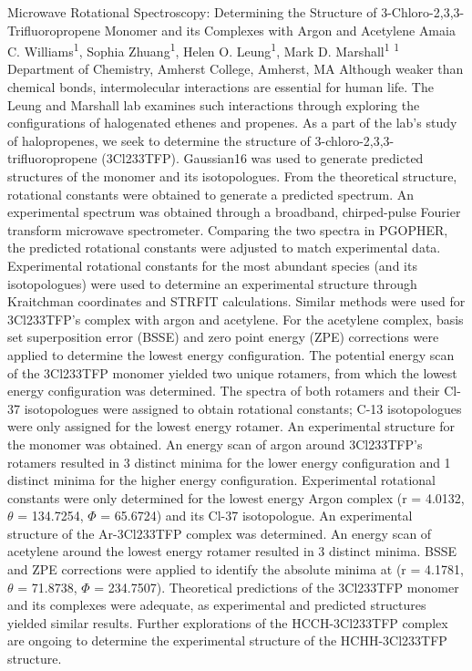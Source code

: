 \makeabstract
    {
    Microwave Rotational Spectroscopy: Determining the Structure of 3-Chloro-2,3,3-Trifluoropropene Monomer and its Complexes with Argon and Acetylene
    }
    {
    \vspace{-20pt}
    Amaia C. Williams\textsuperscript{1}, Sophia Zhuang\textsuperscript{1}, Helen O. Leung\textsuperscript{1}, Mark D. Marshall\textsuperscript{1}
    }
    {
    \textsuperscript{1} Department of Chemistry, Amherst College, Amherst, MA
    }
    {
    Although weaker than chemical bonds, intermolecular interactions are essential for human life. The Leung and Marshall lab examines such interactions through exploring the configurations of halogenated ethenes and propenes. As a part of the lab{\textquoteright}s study of halopropenes, we seek to determine the structure of 3-chloro-2,3,3-trifluoropropene (3Cl233TFP).
    }
    {
    Gaussian16 was used to generate predicted structures of the monomer and its isotopologues. From the theoretical structure, rotational constants were obtained to generate a predicted spectrum. An experimental spectrum was obtained through a broadband, chirped-pulse Fourier transform microwave spectrometer. Comparing the two spectra in PGOPHER, the predicted rotational constants were adjusted to match experimental data. Experimental rotational constants for the most abundant species (and its isotopologues) were used to determine an experimental structure through Kraitchman coordinates and STRFIT calculations. Similar methods were used for 3Cl233TFP{\textquoteright}s complex with argon and acetylene. For the acetylene complex, basis set superposition error (BSSE) and zero point energy (ZPE) corrections were applied to determine the lowest energy configuration. 
    }
    {
    The potential energy scan of the 3Cl233TFP monomer yielded two unique rotamers, from which the lowest energy configuration was determined. The spectra of both rotamers and their Cl-37 isotopologues were assigned to obtain rotational constants; C-13 isotopologues were only assigned for the lowest energy rotamer. An experimental structure for the monomer was obtained. An energy scan of argon around 3Cl233TFP{\textquoteright}s rotamers resulted in 3 distinct minima for the lower energy configuration and 1 distinct minima for the higher energy configuration. Experimental rotational constants were only determined for the lowest energy Argon complex (r = 4.0132, \ensuremath{\theta} = 134.7254, \ensuremath{\Phi} = 65.6724) and its Cl-37 isotopologue. An experimental structure of the Ar-3Cl233TFP complex was determined. An energy scan of acetylene around the lowest energy rotamer resulted in 3 distinct minima. BSSE and ZPE corrections were applied to identify the absolute minima at (r = 4.1781, \ensuremath{\theta} = 71.8738, \ensuremath{\Phi} = 234.7507). 
    }
    {
    Theoretical predictions of the 3Cl233TFP monomer and its complexes were adequate, as experimental and predicted structures yielded similar results. Further explorations of the HCCH-3Cl233TFP complex are ongoing to determine the experimental structure of the HCHH-3Cl233TFP structure.
    }

    \newpage
    